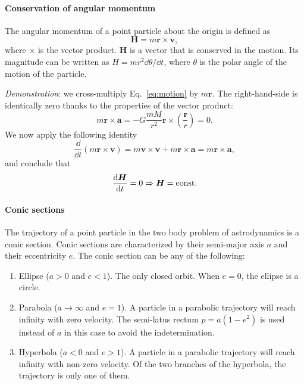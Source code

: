\paragraph{Conservation of angular momentum}

The angular momentum of a point particle about the origin is defined as
%
\begin{equation}
\bm H = m\bm r \times \bm v,
\end{equation}
%
where $\times$ is the vector product. $\bm H$ is a vector that is conserved in 
the motion. Its magnitude can be written as $H=mr^2 \dd \theta/\dd t$, where 
$\theta$ is the polar angle of the motion of the particle.

\emph{Demonstration}: we cross-multiply Eq.~\eqref{eq:motion} by $m\bm r$. The 
right-hand-side is identically zero thanks to the properties of the vector 
product:
%
\begin{equation}
m\bm r\times \bm a
= - G\frac{mM}{r^2}\bm r\times \left(\frac{\bm r}{r}\right) = 0.
\end{equation}
%
We now apply the following identity
%
\begin{equation}
\frac{\dd}{\dd t}\left(m\bm r \times \bm v\right) 
= m \bm v \times \bm v + m\bm r \times \bm a =  m\bm r \times \bm a,
\end{equation}
%
and conclude that
%
\begin{equation}
\frac{\mathrm{d} \bm H}{\mathrm{d} t} = 0 \Rightarrow \bm H = \text{const}.
\end{equation}

\paragraph{Conic sections}

The trajectory of a point particle in the two body problem of astrodynamics
is a conic section. Conic sections are characterized by their semi-major axis 
$a$ and their eccentricity $e$. The conic section can be any of the following:
%
\begin{enumerate}
\item Ellipse ($a>0$ and $e<1$). The only closed orbit. When $e=0$, the 
ellipse is a circle.
\item Parabola ($a\to \infty$ and $e=1$). A particle in a parabolic trajectory 
will reach infinity with zero velocity. The semi-latus rectum $p=a(1-e^2)$ 
is used instead of $a$ in this case to avoid the indetermination.
\item Hyperbola ($a<0$ and $e>1$). A particle in a parabolic trajectory 
will reach infinity with non-zero velocity. Of the two branches of the 
hyperbola, the trajectory is only one of them.
\end{enumerate}
% 

